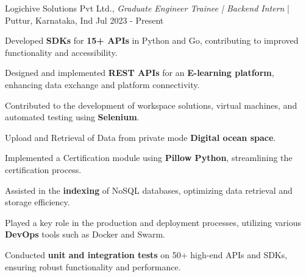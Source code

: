 
\begin{cventries2}


  \cventrynew
    {Logichive Solutions Pvt Ltd., \textnormal{\textit{Graduate Engineer Trainee | Backend Intern} | Puttur, Karnataka, Ind}} %
    {Jul 2023 - Present} %
    {
      {\begin{cvitems} %
          \item {Developed {\bf SDKs} for {\bf 15+ APIs} in Python and Go, contributing to improved functionality and accessibility.}
          \item {Designed and implemented {\bf REST APIs} for an {\bf E-learning platform}, enhancing data exchange and platform connectivity.}
          \item {Contributed to the development of workspace solutions, virtual machines, and automated testing using {\bf Selenium}.}
          \item {Upload and Retrieval of Data from private mode {\bf Digital ocean space}.}
          \item {Implemented a Certification module using {\bf Pillow Python}, streamlining the certification process.}
          \item {Assisted in the {\bf indexing} of NoSQL databases, optimizing data retrieval and storage efficiency.}
          \item {Played a key role in the production and deployment processes, utilizing various {\bf DevOps} tools such as Docker and Swarm.}
          \item {Conducted {\bf unit and integration tests} on 50+ high-end APIs and SDKs, ensuring robust functionality and performance.}
    \end{cvitems}}
    }
    

\end{cventries2}
